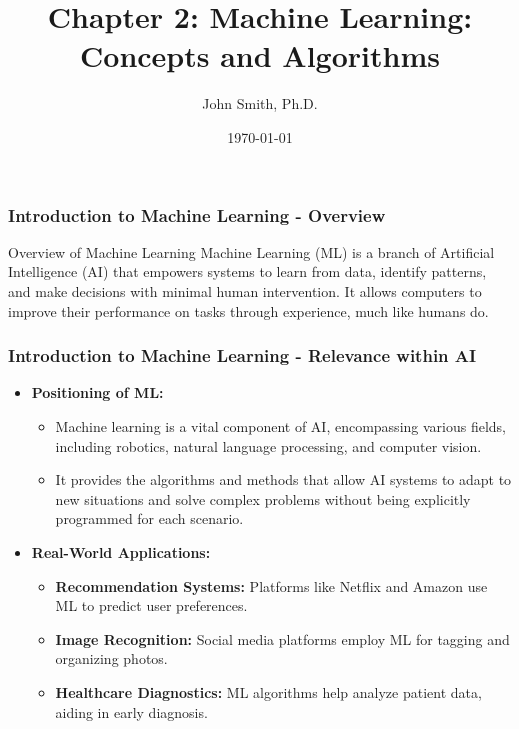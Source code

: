 \documentclass[aspectratio=169]{beamer}
\title[Machine Learning]{Chapter 2: Machine Learning: Concepts and Algorithms}
\author[J. Smith]{John Smith, Ph.D.}
\institute[University Name]{
  Department of Computer Science\\
  University Name\\
  \vspace{0.3cm}
  Email: email@university.edu\\
  Website: www.university.edu
}
\date{\today}
\begin{document}
\frame{\titlepage}

\begin{frame}[fragile]
    \titlepage
\end{frame}

\begin{frame}[fragile]
    \frametitle{Introduction to Machine Learning - Overview}
    \begin{block}{Overview of Machine Learning}
        Machine Learning (ML) is a branch of Artificial Intelligence (AI) that empowers systems to learn from data, identify patterns, and make decisions with minimal human intervention. It allows computers to improve their performance on tasks through experience, much like humans do.
    \end{block}
\end{frame}

\begin{frame}[fragile]
    \frametitle{Introduction to Machine Learning - Relevance within AI}
    \begin{itemize}
        \item \textbf{Positioning of ML:}
        \begin{itemize}
            \item Machine learning is a vital component of AI, encompassing various fields, including robotics, natural language processing, and computer vision.
            \item It provides the algorithms and methods that allow AI systems to adapt to new situations and solve complex problems without being explicitly programmed for each scenario.
        \end{itemize}

        \item \textbf{Real-World Applications:}
        \begin{itemize}
            \item \textbf{Recommendation Systems:} Platforms like Netflix and Amazon use ML to predict user preferences.
            \item \textbf{Image Recognition:} Social media platforms employ ML for tagging and organizing photos.
            \item \textbf{Healthcare Diagnostics:} ML algorithms help analyze patient data, aiding in early diagnosis.
        \end{itemize}
    \end{itemize}
\end{frame}
\end{document}
